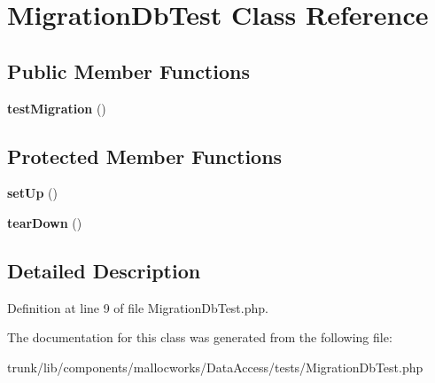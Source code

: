 \hypertarget{class_migration_db_test}{
\section{MigrationDbTest Class Reference}
\label{class_migration_db_test}
}
\subsection*{Public Member Functions}
\begin{DoxyCompactItemize}
\item 
\hypertarget{class_migration_db_test_a272beb0bb939cb105da0997619ca5d5f}{
{\bfseries testMigration} ()}
\label{class_migration_db_test_a272beb0bb939cb105da0997619ca5d5f}

\end{DoxyCompactItemize}
\subsection*{Protected Member Functions}
\begin{DoxyCompactItemize}
\item 
\hypertarget{class_migration_db_test_a0bc688732d2b3b162ffebaf7812e78da}{
{\bfseries setUp} ()}
\label{class_migration_db_test_a0bc688732d2b3b162ffebaf7812e78da}

\item 
\hypertarget{class_migration_db_test_a80fe3d17e658907fc75346a0ec9d6fc7}{
{\bfseries tearDown} ()}
\label{class_migration_db_test_a80fe3d17e658907fc75346a0ec9d6fc7}

\end{DoxyCompactItemize}


\subsection{Detailed Description}


Definition at line 9 of file MigrationDbTest.php.



The documentation for this class was generated from the following file:\begin{DoxyCompactItemize}
\item 
trunk/lib/components/mallocworks/DataAccess/tests/MigrationDbTest.php\end{DoxyCompactItemize}
